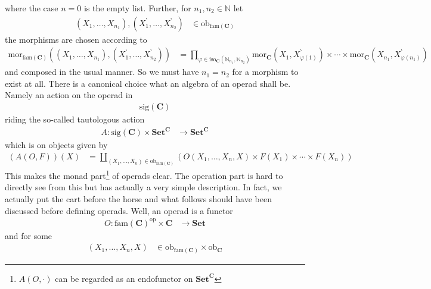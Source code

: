 where the case $n=0$ is the empty list. Further, for $n_{1},n_{2} \in \mathbb{N}$ let
\begin{align*}
  (X_{1},\ldots,X_{n_{1}}),
  (X_{1}^{\backprime},\ldots,X_{n_{2}}^{\backprime})
  &\in
  \mathrm{ob}_{\mathrm{fam}(\mathbf{C})}
\end{align*}
the morphisms are chosen according to
\begin{align*}
  \mathrm{mor}_{\mathrm{fam}(\mathbf{C})}
  \left(
    (X_{1},\ldots,X_{n_{1}}),
    (X_{1}^{\backprime},\ldots,X_{n_{2}}^{\backprime})
  \right)
  &=
  \prod_{\varphi \in \mathrm{iso}_{\mathbf{C}}(\mathbb{N}_{n_{1}},\mathbb{N}_{n_{2}})}
  \mathrm{mor}_{\mathbf{C}}(X_{1},X_{\varphi(1)}^{\backprime})
  \times
  \cdots
  \times
  \mathrm{mor}_{\mathbf{C}}(X_{n_{1}},X_{\varphi(n_{1})}^{\backprime})
\end{align*}
and composed in the usual manner. So we must have $n_{1} = n_{2}$ for a morphism to exist at all. There is a canonical choice what an algebra of an operad shall be. Namely an action on the operad in 
\begin{align*}
  \mathrm{sig}(\mathbf{C})
\end{align*}
riding the so-called tautologous action
\begin{align*}
  A
  \colon
  \mathrm{sig}(\mathbf{C})
  \times
  \mathbf{Set}^{\mathbf{C}}
  &\rightarrow
  \mathbf{Set}^{\mathbf{C}}
\end{align*}
which is on objects given by
\begin{align*}
  \left(
    A(O,F)
  \right)
  (X)
  &=
  \coprod_{(X_{1},\ldots,X_{n}) \in \mathrm{ob}_{\mathrm{fam}(\mathbf{C})}}
  \left(
    O(X_{1},\ldots,X_{n},X)
    \times
    F(X_{1})
    \times
    \cdots
    \times
    F(X_{n})
  \right)
\end{align*}
This makes the monad part\footnote{$A(O,\cdot)$ can be regarded as an endofunctor on $\mathbf{Set}^{\mathbf{C}}$} of operads clear. The operation part is hard to directly see from this but has actually a very simple description. In fact, we actually put the cart before the horse and what follows should have been discussed before defining operads. Well, an operad is a functor
\begin{align*}
  O
  \colon
  \mathrm{fam}(\mathbf{C})^{\mathrm{op}}
  \times
  \mathbf{C}
  &\rightarrow
  \mathbf{Set}
\end{align*}
and for some
\begin{align*}
  (X_{1},\ldots,X_{n},X)
  &\in
  \mathrm{ob}_{\mathrm{fam}(\mathbf{C})}
  \times
  \mathrm{ob}_{\mathbf{C}}
\end{align*}

